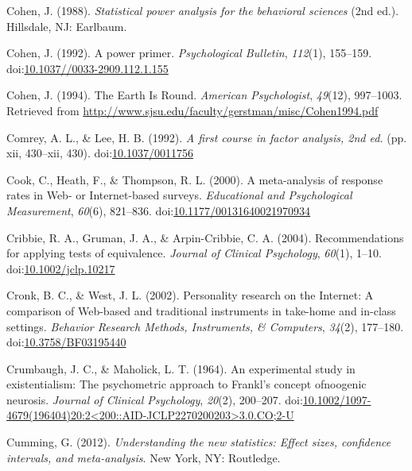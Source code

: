 \documentclass[english,man, mask]{apa6}
\theoremstyle{definition}
\theoremstyle{definition}
\theoremstyle{definition}
\theoremstyle{remark}
\begin{document}
\hypertarget{ref-Cohen1988}{}
Cohen, J. (1988). \emph{Statistical power analysis for the behavioral
sciences} (2nd ed.). Hillsdale, NJ: Earlbaum.

\hypertarget{ref-Cohen1992a}{}
Cohen, J. (1992). A power primer. \emph{Psychological Bulletin},
\emph{112}(1), 155--159.
doi:\href{https://doi.org/10.1037//0033-2909.112.1.155}{10.1037//0033-2909.112.1.155}

\hypertarget{ref-Cohen1994}{}
Cohen, J. (1994). The Earth Is Round. \emph{American Psychologist},
\emph{49}(12), 997--1003. Retrieved from
\url{http://www.sjsu.edu/faculty/gerstman/misc/Cohen1994.pdf}

\hypertarget{ref-Comrey1992}{}
Comrey, A. L., \& Lee, H. B. (1992). \emph{A first course in factor
analysis, 2nd ed.} (pp. xii, 430--xii, 430).
doi:\href{https://doi.org/10.1037/0011756}{10.1037/0011756}

\hypertarget{ref-Cook2000}{}
Cook, C., Heath, F., \& Thompson, R. L. (2000). A meta-analysis of
response rates in Web- or Internet-based surveys. \emph{Educational and
Psychological Measurement}, \emph{60}(6), 821--836.
doi:\href{https://doi.org/10.1177/00131640021970934}{10.1177/00131640021970934}

\hypertarget{ref-Cribbie2004}{}
Cribbie, R. A., Gruman, J. A., \& Arpin-Cribbie, C. A. (2004).
Recommendations for applying tests of equivalence. \emph{Journal of
Clinical Psychology}, \emph{60}(1), 1--10.
doi:\href{https://doi.org/10.1002/jclp.10217}{10.1002/jclp.10217}

\hypertarget{ref-Cronk2002}{}
Cronk, B. C., \& West, J. L. (2002). Personality research on the
Internet: A comparison of Web-based and traditional instruments in
take-home and in-class settings. \emph{Behavior Research Methods,
Instruments, \& Computers}, \emph{34}(2), 177--180.
doi:\href{https://doi.org/10.3758/BF03195440}{10.3758/BF03195440}

\hypertarget{ref-Crumbaugh1964}{}
Crumbaugh, J. C., \& Maholick, L. T. (1964). An experimental study in
existentialism: The psychometric approach to Frankl's concept ofnoogenic
neurosis. \emph{Journal of Clinical Psychology}, \emph{20}(2), 200--207.
doi:\href{https://doi.org/10.1002/1097-4679(196404)20:2\%3C200::AID-JCLP2270200203\%3E3.0.CO;2-U}{10.1002/1097-4679(196404)20:2\textless{}200::AID-JCLP2270200203\textgreater{}3.0.CO;2-U}

\hypertarget{ref-Cumming2012}{}
Cumming, G. (2012). \emph{Understanding the new statistics: Effect
sizes, confidence intervals, and meta-analysis}. New York, NY:
Routledge.
\end{document}
